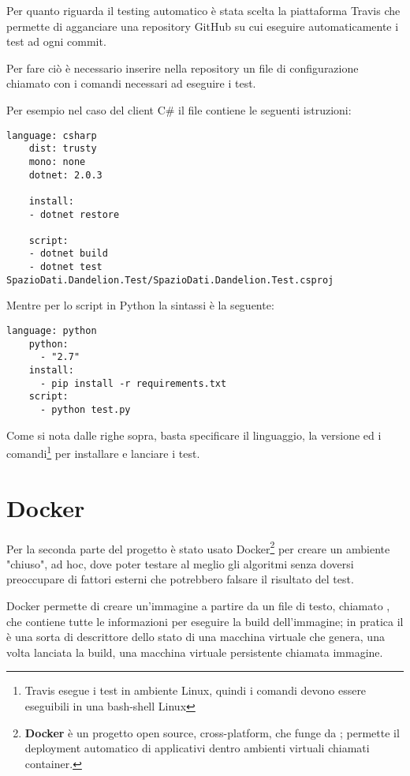Per quanto riguarda il testing automatico è stata scelta la piattaforma Travis che permette di agganciare una repository GitHub su cui eseguire automaticamente i test 
ad ogni commit. 

Per fare ciò è necessario inserire nella repository un file di configurazione chiamato  con i comandi necessari ad eseguire i test. 

Per esempio nel caso del client C$\#$ il file  contiene le seguenti istruzioni:

\begin{lstlisting}[style=YmlStyle, caption=File configurazione travis.yml per progetti C$\#$]
    language: csharp
    dist: trusty
    mono: none
    dotnet: 2.0.3

    install:
    - dotnet restore

    script:
    - dotnet build
    - dotnet test SpazioDati.Dandelion.Test/SpazioDati.Dandelion.Test.csproj
\end{lstlisting}

Mentre per lo script in Python la sintassi è la seguente:
\begin{lstlisting}[style=YmlStyle, caption=File configurazione travis.yml per progetti Python]
    language: python
    python: 
      - "2.7"
    install:
      - pip install -r requirements.txt
    script:
      - python test.py
\end{lstlisting}

Come si nota dalle righe sopra, basta specificare il linguaggio, la versione ed i comandi\footnote{
    Travis esegue i test in ambiente Linux, quindi i comandi devono essere eseguibili in una bash-shell Linux
}
per installare e lanciare i test.

\section{Docker}
Per la seconda parte del progetto è stato usato Docker\footnote{
    \textbf{Docker}\cite{docker} è un progetto open source, cross-platform, che funge da ; 
    permette il deployment automatico di applicativi dentro ambienti virtuali chiamati container.
} per creare un ambiente "chiuso", ad hoc, dove poter testare al meglio gli algoritmi senza doversi preoccupare di fattori esterni che potrebbero falsare 
il risultato del test. 

Docker permette di creare un'immagine a partire da un file di testo, chiamato , che contiene tutte le informazioni per eseguire la build dell'immagine; 
in pratica il  è una sorta di descrittore dello stato di una macchina virtuale che genera, una volta lanciata la build, una macchina virtuale persistente chiamata immagine. 

